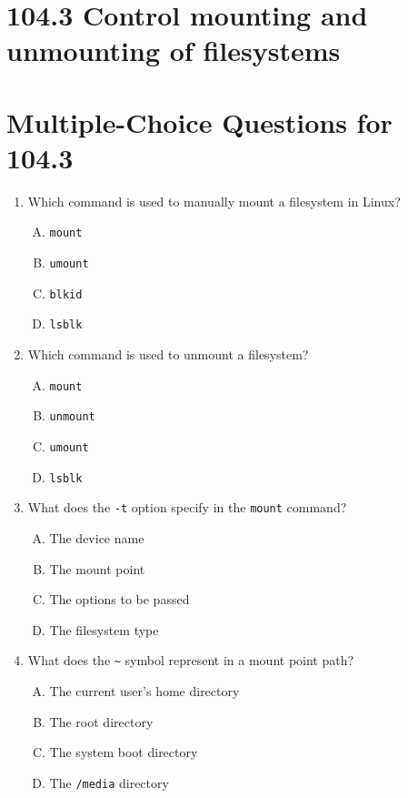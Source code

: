 \documentclass[a4paper]{report}
\begin{document}
\section*{104.3 Control mounting and unmounting of filesystems}

\newpage
\section*{Multiple-Choice Questions for 104.3}
\begin{enumerate}[1.]

    \item Which command is used to manually mount a filesystem in Linux?  
    \begin{enumerate}[A)]
        \item \texttt{mount}  
        \item \texttt{umount}  
        \item \texttt{blkid}  
        \item \texttt{lsblk}  
    \end{enumerate}

    \item Which command is used to unmount a filesystem?  
    \begin{enumerate}[A)]
        \item \texttt{mount}  
        \item \texttt{unmount}  
        \item \texttt{umount}  
        \item \texttt{lsblk}  
    \end{enumerate}

    \item What does the \texttt{-t} option specify in the \texttt{mount} command?  
    \begin{enumerate}[A)]
        \item The device name  
        \item The mount point  
        \item The options to be passed  
        \item The filesystem type  
    \end{enumerate}

    \item What does the \texttt{\textasciitilde} symbol represent in a mount point path?  
    \begin{enumerate}[A)]
        \item The current user's home directory  
        \item The root directory  
        \item The system boot directory  
        \item The \texttt{/media} directory  
    \end{enumerate}


\end{enumerate}
\end{document}
